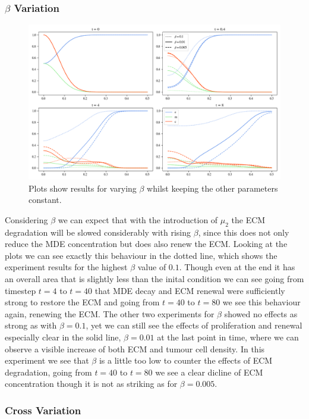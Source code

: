 \subsubsection*{$\beta$ Variation}
\begin{figure}[h]
    \centering
    \includegraphics[width=\textwidth]{resources/images/prolif_beta_variation.png}
    \caption{Plots show results for varying $\beta$ whilst keeping the other parameters constant.}
    \label{fig:prolif_beta_variation}
\end{figure}

Considering $\beta$ we can expect that with the introduction of $\mu_2$ the ECM degradation will be slowed considerably with rising $\beta$, since this does not only reduce the MDE concentration but does also renew the ECM. Looking at the plots we can see exactly this behaviour in the dotted line, which shows the experiment results for the highest $\beta$ value of $0.1$. Though even at the end it has an overall area that is slightly less than the inital condition we can see going from timestep $t=4$ to $t=40$ that MDE decay and ECM renewal were sufficiently strong to restore the ECM and going from $t=40$ to $t=80$ we see this behaviour again, renewing the ECM. The other two experiments for $\beta$ showed no effects as strong as with $\beta=0.1$, yet we can still see the effects of proliferation and renewal especially clear in the solid line, $\beta=0.01$ at the last point in time, where we can observe a visible increase of both ECM and tumour cell density. In this experiment we see that $\beta$ is a little too low to counter the effects of ECM degradation, going from $t=40$ to $t=80$ we see a clear dicline of ECM concentration though it is not as striking as for $\beta=0.005$. 

\subsubsection*{Cross Variation}

